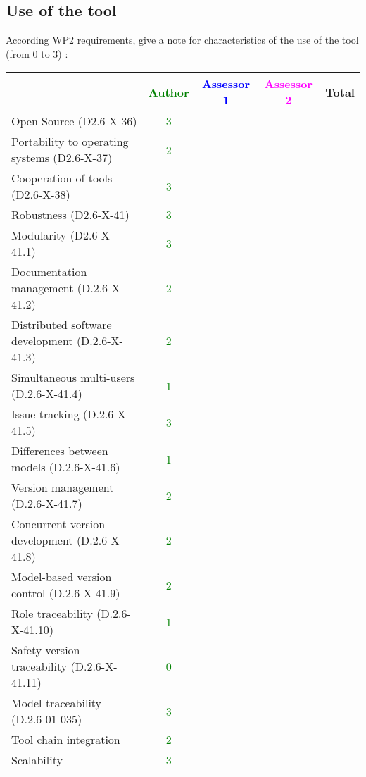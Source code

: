 \begin{author_comment}
\section{Use of the tool}


According WP2 requirements, give a note for characteristics of the use of the tool (from 0 to 3) :

\begin{tabular}{|l | c | c | c | c|}
\hline
& \textcolor{green}{Author} & \textcolor{blue}{Assessor 1} & \textcolor{magenta}{Assessor 2} & Total \\
\hline 
Open Source (D2.6-X-36) & \textcolor{green}{3} & & &  \\
\hline 
Portability to operating systems (D2.6-X-37) & \textcolor{green}{2} & & &  \\
\hline
Cooperation of tools (D2.6-X-38) & \textcolor{green}{3} & & &  \\
\hline
Robustness (D2.6-X-41) & \textcolor{green}{3} & & & \\
\hline
Modularity (D2.6-X-41.1) & \textcolor{green}{3} & & & \\
\hline
Documentation management (D.2.6-X-41.2) & \textcolor{green}{2} & & & \\
\hline
Distributed software development (D.2.6-X-41.3)  & \textcolor{green}{2} & & & \\
\hline
Simultaneous multi-users (D.2.6-X-41.4)   & \textcolor{green}{1} & & & \\
\hline
Issue tracking (D.2.6-X-41.5) & \textcolor{green}{3} & & & \\
\hline
Differences between models (D.2.6-X-41.6) & \textcolor{green}{1} & & & \\
\hline
Version management (D.2.6-X-41.7) & \textcolor{green}{2} & & & \\
\hline
Concurrent version development (D.2.6-X-41.8) & \textcolor{green}{2} & & & \\
\hline
Model-based version control (D.2.6-X-41.9) & \textcolor{green}{2} & & & \\
\hline
Role traceability (D.2.6-X-41.10) & \textcolor{green}{1} & & & \\
\hline
Safety version traceability (D.2.6-X-41.11) & \textcolor{green}{0} & & & \\
\hline
Model traceability (D.2.6-01-035) & \textcolor{green}{3} & & & \\
\hline
Tool chain integration & \textcolor{green}{2} & & & \\
\hline
Scalability & \textcolor{green}{3} & & & \\
\hline
\end{tabular}


\end{author_comment}
